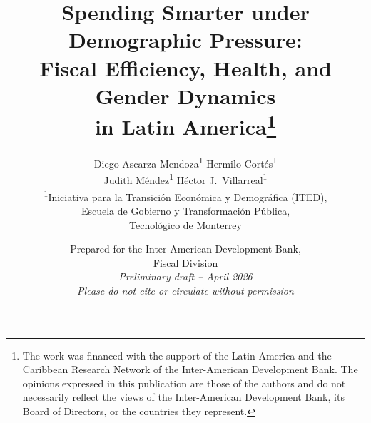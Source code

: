 \documentclass[12pt,a4paper]{article}
\begin{document}
\title{\textbf{Spending Smarter under Demographic Pressure:}\\[6pt]
Fiscal Efficiency, Health, and Gender Dynamics\\
in Latin America\thanks{The work was financed with the support of the Latin America and the Caribbean Research Network of the Inter-American Development Bank. The opinions expressed in this publication are those of the authors and do not necessarily reflect the views of the Inter-American Development Bank, its Board of Directors, or the countries they represent.}}

\author{
Diego Ascarza-Mendoza\textsuperscript{1} \quad Hermilo Cort\'es\textsuperscript{1}\\[3pt]
Judith M\'endez\textsuperscript{1} \quad H\'ector J.\ Villarreal\textsuperscript{1}
\\[6pt]
\textsuperscript{1}Iniciativa para la Transici\'on Econ\'omica y Demogr\'afica (ITED),\\
Escuela de Gobierno y Transformaci\'on P\'ublica,\\
Tecnol\'ogico de Monterrey
}

\date{%
Prepared for the Inter-American Development Bank,\\
Fiscal Division\\[12pt]
\textit{Preliminary draft -- April 2026}\\
\textit{Please do not cite or circulate without permission}
}

\maketitle
\end{document}
